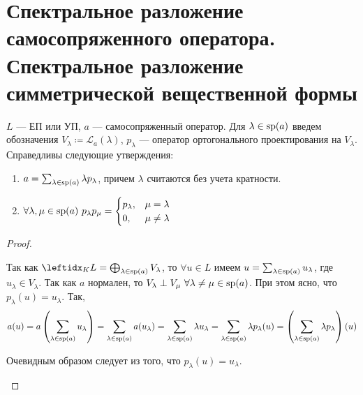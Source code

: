 \section{Спектральное разложение самосопряженного оператора. Спектральное разложение симметрической вещественной формы}

\begin{thm*}
    $L$ --- ЕП или УП, $a$ --- самосопряженный оператор. Для $\lambda \in \operatorname{sp}(a)$ введем обозначения $V_\lambda \coloneqq \mathcal{L}_a(\lambda)$, $p_\lambda$ --- оператор ортогонального проектирования на $V_\lambda$. Справедливы следующие утверждения:
    \begin{enumerate}
        \item $a = \sum_{\lambda \in \operatorname{sp}(a)} \lambda p_\lambda$, причем $\lambda$ считаются без учета кратности.
        \item $\forall \lambda, \mu \in \spec(a)\ p_\lambda p_\mu = \begin{cases}
            p_\lambda, & \mu = \lambda \\
            0,         & \mu \neq \lambda
        \end{cases}$
    \end{enumerate}
\end{thm*}

\begin{proof}
    \begin{proofpart}
        Так как $\lsub{K}{L} = \bigoplus_{\lambda \in \spec(a)} V_\lambda$, то $\forall u \in L$ имеем $u = \sum_{\lambda \in \operatorname{sp}(a)} u_\lambda$, где $u_\lambda \in V_\lambda$. Так как $a$ нормален, то $V_\lambda \perp V_\mu\ \forall \lambda \neq \mu \in \operatorname{sp}(a)$. При этом ясно, что $p_\lambda(u) = u_\lambda$. Так,
        $$a(u) = a\left(\sum_{\lambda \in \operatorname{sp}(a)} u_\lambda\right) = \sum_{\lambda \in \operatorname{sp}(a)} a(u_\lambda) = \sum_{\lambda \in \operatorname{sp}(a)} \lambda u_\lambda = \sum_{\lambda \in \operatorname{sp}(a)} \lambda p_\lambda(u) = \left(\sum_{\lambda \in \operatorname{sp}(a)} \lambda p_\lambda\right)(u)$$
    \end{proofpart}

    \begin{proofpart}
        Очевидным образом следует из того, что $p_\lambda(u) = u_\lambda$.
    \end{proofpart}
\end{proof}


